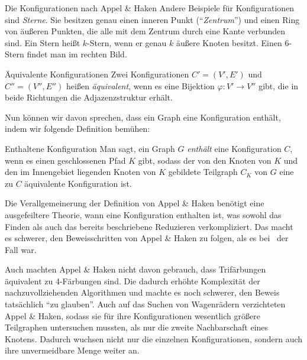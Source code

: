 \begin{section}{Die Konfigurationen nach Appel \& Haken}
  Andere Beispiele für Konfigurationen sind \textit{Sterne}. Sie besitzen genau einen inneren Punkt (``\textit{Zentrum}'') und einen Ring von äußeren Punkten, die alle mit dem Zentrum durch eine Kante verbunden sind. Ein Stern heißt $k$-Stern, wenn er genau $k$ äußere Knoten besitzt. Einen $6$-Stern findet man im rechten Bild.
  
  \begin{definition}{Äquivalente Konfigurationen}
   Zwei Konfigurationen $C'=(V',E')$ und $C''=(V'',E'')$ heißen \textit{äquivalent}, wenn es eine Bijektion $\varphi : V' \rightarrow V''$ gibt, die in beide Richtungen die Adjazenzstruktur erhält.
  \end{definition}
  
  Nun können wir davon sprechen, dass ein Graph eine Konfiguration enthält, indem wir folgende Definition bemühen:
  
  \begin{definition}{Enthaltene Konfiguration}
   Man sagt, ein Graph $G$ \textit{enthält} eine Konfiguration $C$, wenn es einen geschlossenen Pfad $K$ gibt, sodass der von den Knoten von $K$ und den im Innengebiet liegenden Knoten von $K$ gebildete Teilgraph $C_K$ von $G$ eine zu $C$ äquivalente Konfiguration ist.
  \end{definition}

  Die Verallgemeinerung der Definition von Appel \& Haken benötigt eine ausgefeiltere Theorie, wann eine Konfiguration enthalten ist, was sowohl das Finden als auch das bereits beschriebene Reduzieren verkompliziert. Das macht es schwerer, den Beweisschritten von Appel \& Haken zu folgen, als es bei \rsst\-\ der Fall war.
  
  Auch machten Appel \& Haken nicht davon gebrauch, dass Trifärbungen äquivalent zu 4-Färbungen sind. Die dadurch erhöhte Komplexität der nachzuvollziehenden Algorithmen und machte es noch schwerer, den Beweis tatsächlich ``zu glauben''. Auch auf das Suchen von Wagenrädern verzichteten Appel \& Haken, sodass sie für ihre Konfigurationen wesentlich größere Teilgraphen untersuchen mussten, als nur die zweite Nachbarschaft eines Knotens. Dadurch wuchsen nicht nur die einzelnen Konfigurationen, sondern auch ihre unvermeidbare Menge weiter an.
\end{section}
